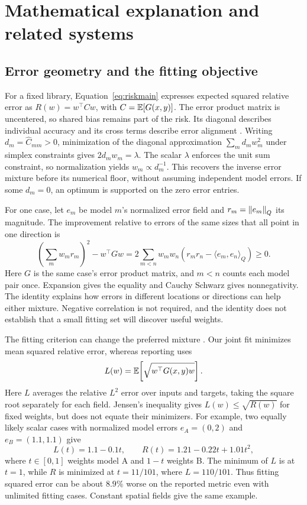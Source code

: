 \section{Mathematical explanation and related systems}
\subsection{Error geometry and the fitting objective}
\label{app:geometry}
For a fixed library, Equation~\eqref{eq:riskmain} expresses expected squared
relative error as $R(w)=w^\top Cw$, with $C=\mathbb{E}[G(x,y)]$. The error product
matrix is uncentered, so shared bias remains part of the risk. Its diagonal
describes individual accuracy and its cross terms describe error alignment
\citep{breiman1996,krogh1994}. Writing $d_m=\widehat C_{mm}>0$, minimization
of the diagonal approximation $\sum_m d_mw_m^2$ under simplex constraints
gives $2d_mw_m=\lambda$. The scalar $\lambda$ enforces the unit sum constraint,
so normalization yields $w_m\propto d_m^{-1}$. This recovers the inverse error
mixture before its numerical floor, without assuming independent model errors.
If some $d_m=0$, an optimum is supported on the zero error entries.

For one case, let $e_m$ be model $m$'s normalized error field and
$r_m=\left\lVert e_m\right\rVert_Q$ its magnitude. The improvement relative to errors of the
same sizes that all point in one direction is
\begin{equation}
 \left(\sum_m w_m r_m\right)^2-w^\top Gw
 =2\sum_{m<n}w_mw_n\left(r_mr_n-\langle e_m,e_n\rangle_Q\right)\geq0.
 \label{eq:direction}
\end{equation}
Here $G$ is the same case's error product matrix, and $m<n$ counts each model
pair once. Expansion gives the equality and Cauchy Schwarz gives nonnegativity.
The identity explains how errors in different locations or directions can help
either mixture. Negative correlation is not required, and the identity does
not establish that a small fitting set will discover useful weights.

The fitting criterion can change the preferred mixture \citep{acar2009,acar2015}.
Our joint fit minimizes mean squared relative error, whereas reporting uses
\begin{equation}
 L(w)=\mathbb{E}\!\left[\sqrt{w^\top G(x,y)w}\right].
 \label{eq:reportedrisk}
\end{equation}
Here $L$ averages the relative $L^2$ error over inputs and targets, taking
the square root separately for each field. Jensen's inequality gives
$L(w)\leq\sqrt{R(w)}$ for fixed weights, but does not equate their minimizers.
For example, two equally likely scalar cases with normalized model errors
$e_A=(0,2)$ and $e_B=(1.1,1.1)$ give
\begin{equation}
 L(t)=1.1-0.1t,\qquad R(t)=1.21-0.22t+1.01t^2,
\end{equation}
where $t\in[0,1]$ weights model A and $1-t$ weights B. The minimum of $L$
is at $t=1$, while $R$ is minimized at $t=11/101$, where $L=110/101$.
Thus fitting squared error can be about $8.9\%$ worse on the reported metric
even with unlimited fitting cases. Constant spatial fields give the same example.

